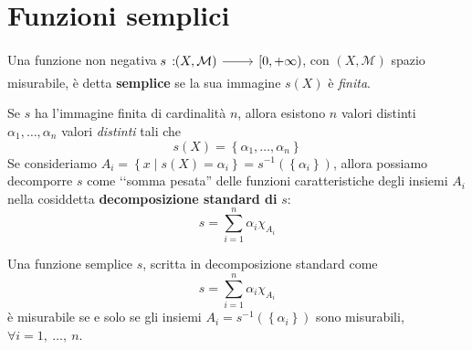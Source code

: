 \section{Funzioni semplici}
\begin{define}
Una funzione non negativa $\funz{s}{\left(X,\mathcal{M}\right)}{\left[0,+\infty\right)}$, con $\left(X,\mathcal{M}\right)$ spazio misurabile, è detta \textbf{semplice} se la sua immagine $s(X)$ è \textit{finita}.
\end{define}
Se $s$ ha l'immagine finita di cardinalità $n$, allora esistono $n$ valori distinti $\alpha_1,\ldots,\alpha_n$  valori \textit{distinti} tali che
\begin{equation*}
	s(X)=\left\{\alpha_1,\ldots,\alpha_n\right\}
\end{equation*}
Se consideriamo $A_i=\left\{x\mid s(X)=\alpha_i\right\}=s^{-1}\left(\left\{\alpha_i\right\}\right)$, allora possiamo decomporre $s$ come ‘‘somma pesata'' delle funzioni caratteristiche degli insiemi $A_i$ nella cosiddetta \textbf{decomposizione standard di }$s$:
\begin{equation}
	s=\sum_{i=1}^{n}\alpha_i\chi_{A_i}
\end{equation}
\begin{proposition}
	Una funzione semplice $s$, scritta in decomposizione standard come
	\begin{equation*}
		s=\sum_{i=1}^{n}\alpha_i\chi_{A_i}
	\end{equation*}
	è misurabile se e solo se gli insiemi $A_i=s^{-1}\left(\left\{\alpha_i\right\}\right)$ sono misurabili, $\forall i=1,\ \ldots,\ n$. 
\end{proposition}
